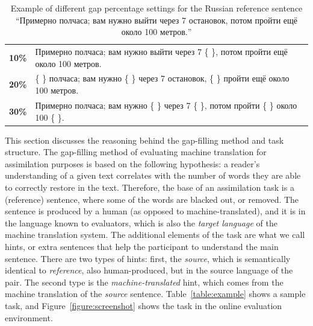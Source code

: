 \documentclass[11pt]{article}
\newcommand{\comment}[1]{\marginpar{\scriptsize\sf \textcolor{blue}{#1}}}
\newcommand{\rus}[1]{\foreignlanguage{russian}{#1}}
\begin{document}
\begin{table}
  \begin{tabular}{|l|l|}
     \hline
     \textbf{10\%}   & \rus{Примерно полчаса; вам нужно выйти через 7 \{ \}, потом пройти ещё около 100 метров.} \\
     \textbf{20\%}   & \rus{\{ \} полчаса; вам нужно \{ \} через 7 остановок, \{ \} пройти ещё около 100 метров.} \\
     \textbf{30\%} & \rus{Примерно полчаса; вам нужно \{ \} через 7 \{ \}, потом пройти \{ \} около 100 \{ \}.} \\
     \hline
  \end{tabular}
  \caption{Example of different gap percentage settings for the Russian reference sentence ``\rus{Примерно полчаса; вам нужно выйти через 7 остановок, потом пройти ещё около 100 метров.}''} 
  \label{table:percentage}
\end{table}


This section discusses the reasoning behind the gap-filling method and task structure. The gap-filling method 
of evaluating machine translation for assimilation purposes is based on the following hypothesis: a reader's understanding 
of a given text correlates with the number of words they are able to correctly restore in the text. Therefore, the 
base of an assimilation task is a (reference) sentence, where some of the words are blacked out, or removed. The sentence \comment{EA: I'm sorry, I'm not sure what else I could explain here...}
is produced by a human (as opposed to machine-translated), and it is in the language known to evaluators, which is also 
the \emph{target language} of the machine translation system.
The additional elements of the task are what we call hints, or extra sentences that help the participant to understand 
the main sentence. There are two types of hints: first, the \emph{source}, which is semantically identical to \emph{reference}, 
also human-produced, but in the source language of the pair. The second type is the \emph{machine-translated} hint, which 
comes from the machine translation of the \emph{source} sentence. Table~\ref{table:example} shows a sample task, and Figure~\ref{figure:screenshot} shows the task in the online evaluation environment.
\end{document}
